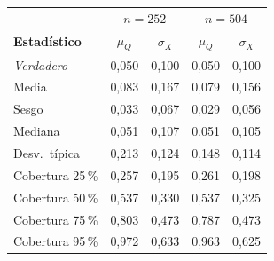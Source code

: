 {\footnotesize
\renewcommand{\arraystretch}{1.18}
\begin{tabular}{l|cc|cc}
\hline
\multicolumn{1}{c}{} & \multicolumn{2}{c}{$n=252$} & \multicolumn{2}{c}{$n=504$} \\
\textbf{Estad\'istico} & $\mu_Q$ & $\sigma_X$ & $\mu_Q$ & $\sigma_X$ \\
\hline
\textit{Verdadero} & 0,050 & 0,100 & 0,050 & 0,100 \\
\hline
Media & 0,083 & 0,167 & 0,079 & 0,156 \\
Sesgo & 0,033 & 0,067 & 0,029 & 0,056 \\
Mediana & 0,051 & 0,107 & 0,051 & 0,105 \\
Desv.\ t\'ipica & 0,213 & 0,124 & 0,148 & 0,114 \\
\hline
Cobertura 25\,\% & 0,257 & 0,195 & 0,261 & 0,198 \\
Cobertura 50\,\% & 0,537 & 0,330 & 0,537 & 0,325 \\
Cobertura 75\,\% & 0,803 & 0,473 & 0,787 & 0,473 \\
Cobertura 95\,\% & 0,972 & 0,633 & 0,963 & 0,625 \\
\hline
\end{tabular}}